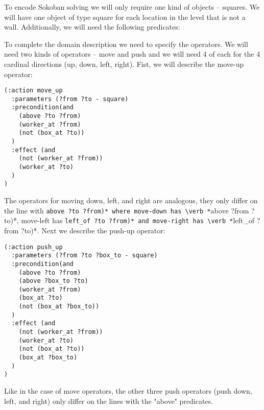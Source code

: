 \documentclass[runningheads]{llncs}
\begin{document}
To encode Sokoban solving we will only require one kind of objects -- squares. We will have one
object of type square for each location in the level that is not a wall. Additionally, we will
need the following predicates:
To complete the domain description we need to specify the operators. We will need two kinds
of operators -- move and push and we will need 4 of each for the 4 cardinal directions (up, down, left, right).
Fist, we will describe the move-up operator:
\begin{verbatim}
(:action move_up
  :parameters (?from ?to - square)
  :precondition(and
    (above ?to ?from)
    (worker_at ?from)
    (not (box_at ?to))
  )
  :effect (and
    (not (worker_at ?from))
    (worker_at ?to)
  )
)
\end{verbatim}
The operators for moving down, left, and right are analogous, they only differ on the line with
\verb *(above ?to ?from)* where move-down has \verb *(above ?from ?to)*, move-left has
\verb *(left_of ?to ?from)* and move-right has \verb *(left_of ?from ?to)*.
Next we describe the push-up operator:
\begin{verbatim}
(:action push_up
  :parameters (?from ?to ?box_to - square)
  :precondition(and
    (above ?to ?from)
    (above ?box_to ?to)
    (worker_at ?from)
    (box_at ?to)
    (not (box_at ?box_to))
  )
  :effect (and
    (not (worker_at ?from))
    (worker_at ?to)
    (not (box_at ?to))
    (box_at ?box_to)
  )
)
\end{verbatim}
Like in the case of move operators, the other three push operators (push down, left, and right) only differ
on the lines with the "above" predicates.
\end{document}
